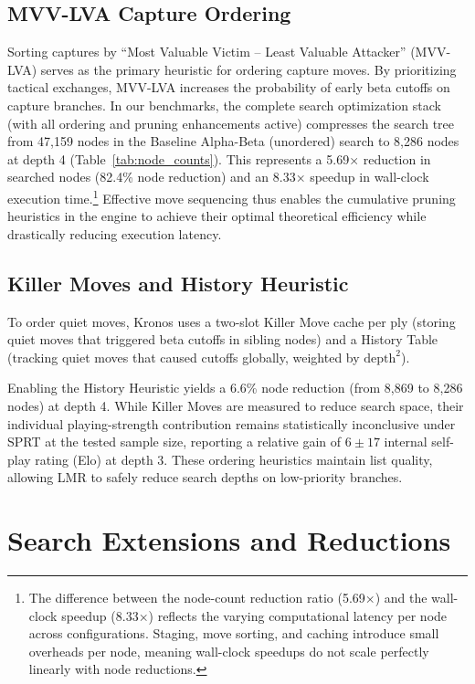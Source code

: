 \subsection{MVV-LVA Capture Ordering}
Sorting captures by ``Most Valuable Victim -- Least Valuable Attacker'' (MVV-LVA) serves as the primary heuristic for ordering capture moves. By prioritizing tactical exchanges, MVV-LVA increases the probability of early beta cutoffs on capture branches. In our benchmarks, the complete search optimization stack (with all ordering and pruning enhancements active) compresses the search tree from 47,159 nodes in the Baseline Alpha-Beta (unordered) search to 8,286 nodes at depth 4 (Table~\ref{tab:node_counts}). This represents a 5.69× reduction in searched nodes (82.4\% node reduction) and an 8.33× speedup in wall-clock execution time.\footnote{The difference between the node-count reduction ratio (5.69×) and the wall-clock speedup (8.33×) reflects the varying computational latency per node across configurations. Staging, move sorting, and caching introduce small overheads per node, meaning wall-clock speedups do not scale perfectly linearly with node reductions.} Effective move sequencing thus enables the cumulative pruning heuristics in the engine to achieve their optimal theoretical efficiency while drastically reducing execution latency.

\subsection{Killer Moves and History Heuristic}
To order quiet moves, Kronos uses a two-slot Killer Move cache per ply (storing quiet moves that triggered beta cutoffs in sibling nodes) and a History Table (tracking quiet moves that caused cutoffs globally, weighted by $\text{depth}^2$).

Enabling the History Heuristic yields a 6.6\% node reduction (from 8,869 to 8,286 nodes) at depth 4. While Killer Moves are measured to reduce search space, their individual playing-strength contribution remains statistically inconclusive under SPRT at the tested sample size, reporting a relative gain of $6 \pm 17$ internal self-play rating (Elo) at depth 3. These ordering heuristics maintain list quality, allowing LMR to safely reduce search depths on low-priority branches.

\section{Search Extensions and Reductions}

